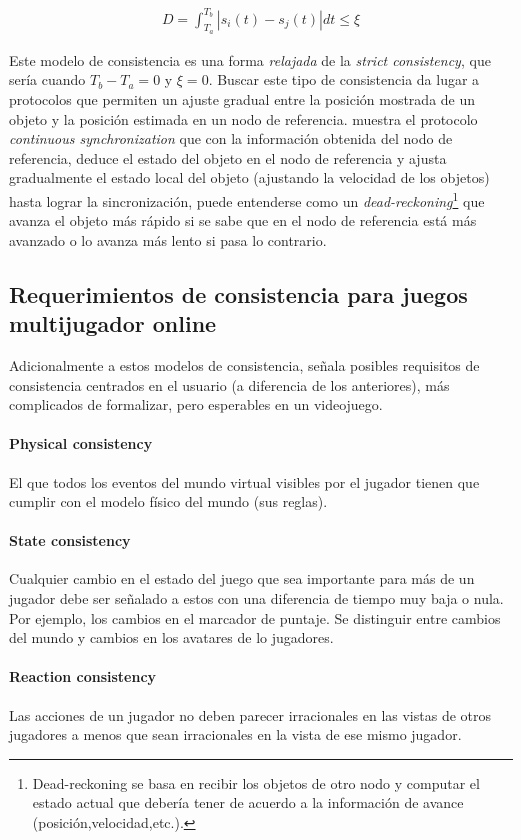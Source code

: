 \begin{align*}
    D = \int_{T_a}^{T_b}|s_i(t) - s_j(t)| dt \leq \xi
\end{align*}

Este modelo de consistencia es una forma \emph{relajada} de la \emph{strict consistency}, que sería cuando $T_b-T_a = 0$ y $\xi = 0$. Buscar este tipo de consistencia da lugar a protocolos que permiten un ajuste gradual entre la posición mostrada de un objeto y la posición estimada en un nodo de referencia. \cite{li2004supporting} muestra el protocolo \emph{continuous synchronization} que con la información obtenida del nodo de referencia, deduce el estado del objeto en el nodo de referencia y ajusta gradualmente el estado local del objeto (ajustando la velocidad de los objetos) hasta lograr la sincronización, puede entenderse como un \emph{dead-reckoning}\footnote{Dead-reckoning se basa en recibir los objetos de otro nodo y computar el estado actual que debería tener de acuerdo a la información de avance (posición,velocidad,etc.).} que avanza el objeto más rápido si se sabe que en el nodo de referencia está más avanzado o lo avanza más lento si pasa lo contrario.

\subsection{Requerimientos de consistencia para juegos multijugador online}

Adicionalmente a estos modelos de consistencia, \cite{palant2006consistency} señala posibles requisitos de consistencia centrados en el usuario (a diferencia de los anteriores), más complicados de formalizar, pero esperables en un videojuego.

\paragraph{Physical consistency} El que todos los eventos del mundo virtual visibles por el jugador tienen que cumplir con el modelo físico del mundo (sus reglas).

\paragraph{State consistency} Cualquier cambio en el estado del juego que sea importante para más de un jugador debe ser señalado a estos con una diferencia de tiempo muy baja o nula. Por ejemplo, los cambios en el marcador de puntaje. Se distinguir entre cambios del mundo y cambios en los avatares de lo jugadores.

\paragraph{Reaction consistency} Las acciones de un jugador no deben parecer irracionales en las vistas de otros jugadores a menos que sean irracionales en la vista de ese mismo jugador.
